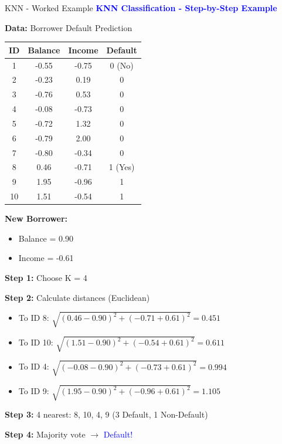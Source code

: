\documentclass[8pt]{beamer}
\begin{document}
	\begin{frame}{KNN - Worked Example}
		\fontsize{6.5}{7.5}\selectfont
		\textcolor{blue}{\textbf{KNN Classification - Step-by-Step Example}}
		
		\textbf{Data:} Borrower Default Prediction
		
		\begin{tabular}{|c|c|c|c|}
			\hline
			\textbf{ID} & \textbf{Balance} & \textbf{Income} & \textbf{Default} \\
			\hline
			1 & -0.55 & -0.75 & 0 (No) \\
			\hline
			2 & -0.23 & 0.19 & 0 \\
			\hline
			3 & -0.76 & 0.53 & 0 \\
			\hline
			4 & -0.08 & -0.73 & 0 \\
			\hline
			5 & -0.72 & 1.32 & 0 \\
			\hline
			6 & -0.79 & 2.00 & 0 \\
			\hline
			7 & -0.80 & -0.34 & 0 \\
			\hline
			8 & 0.46 & -0.71 & 1 (Yes) \\
			\hline
			9 & 1.95 & -0.96 & 1 \\
			\hline
			10 & 1.51 & -0.54 & 1 \\
			\hline
		\end{tabular}
		
		\textbf{New Borrower:}
		\begin{itemize}
			\item Balance = 0.90
			\item Income = -0.61
		\end{itemize}
		
		\textbf{Step 1:} Choose K = 4
		
		\textbf{Step 2:} Calculate distances (Euclidean)
		\begin{itemize}
			\item To ID 8: $\sqrt{(0.46-0.90)^2 + (-0.71+0.61)^2} = 0.451$
			\item To ID 10: $\sqrt{(1.51-0.90)^2 + (-0.54+0.61)^2} = 0.611$
			\item To ID 4: $\sqrt{(-0.08-0.90)^2 + (-0.73+0.61)^2} = 0.994$
			\item To ID 9: $\sqrt{(1.95-0.90)^2 + (-0.96+0.61)^2} = 1.105$
		\end{itemize}
		
		\textbf{Step 3:} 4 nearest: 8, 10, 4, 9 (3 Default, 1 Non-Default)
		
		\textbf{Step 4:} Majority vote $\rightarrow$ \textcolor{blue}{Default!}
	\end{frame}
	
\end{document}

